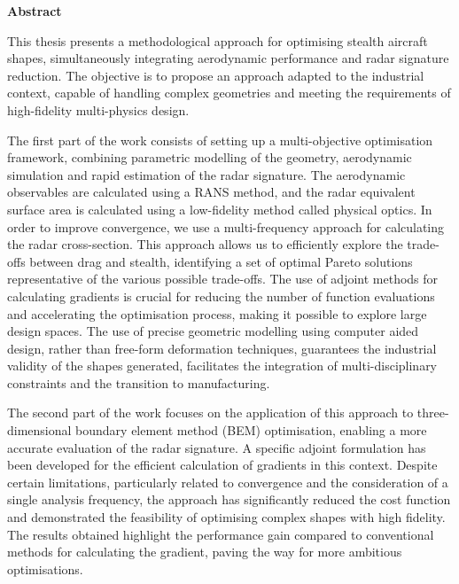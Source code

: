\thispagestyle{plain}
{}
\begin{center}
    \large
    \textbf{\theenglishtitle}

    \vspace{0.4cm}
    \thesubtitle

    \vspace{0.4cm}
    \textbf{\theauthor}

    \vspace{0.9cm}
    \Large
    \textbf{Abstract}
\end{center}

This thesis presents a methodological approach for optimising stealth aircraft shapes, simultaneously integrating aerodynamic performance and radar signature reduction. The objective is to propose an approach adapted to the industrial context, capable of handling complex geometries and meeting the requirements of high-fidelity multi-physics design.

The first part of the work consists of setting up a multi-objective optimisation framework, combining parametric modelling of the geometry, aerodynamic simulation and rapid estimation of the radar signature. The aerodynamic observables are calculated using a RANS method, and the radar equivalent surface area is calculated using a low-fidelity method called physical optics. In order to improve convergence, we use a multi-frequency approach for calculating the radar cross-section. This approach allows us to efficiently explore the trade-offs between drag and stealth, identifying a set of optimal Pareto solutions representative of the various possible trade-offs. The use of adjoint methods for calculating gradients is crucial for reducing the number of function evaluations and accelerating the optimisation process, making it possible to explore large design spaces. The use of precise geometric modelling using computer aided design, rather than free-form deformation techniques, guarantees the industrial validity of the shapes generated, facilitates the integration of multi-disciplinary constraints and the transition to manufacturing.

The second part of the work focuses on the application of this approach to three-dimensional boundary element method (BEM) optimisation, enabling a more accurate evaluation of the radar signature. A specific adjoint formulation has been developed for the efficient calculation of gradients in this context. Despite certain limitations, particularly related to convergence and the consideration of a single analysis frequency, the approach has significantly reduced the cost function and demonstrated the feasibility of optimising complex shapes with high fidelity. The results obtained highlight the performance gain compared to conventional methods for calculating the gradient, paving the way for more ambitious optimisations.


